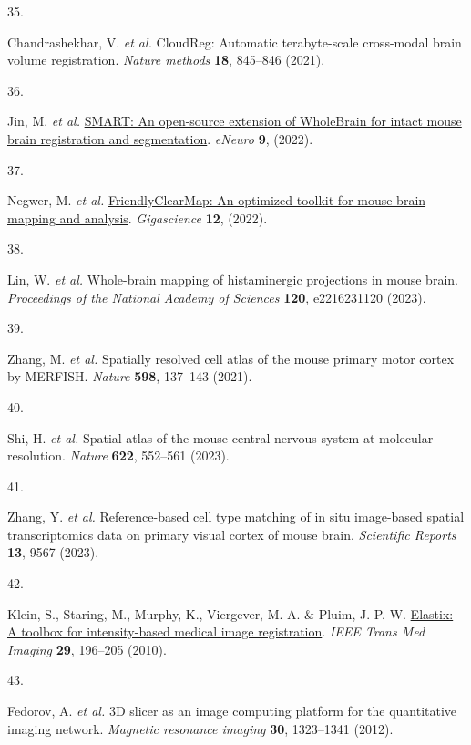 \documentclass[
  12pt,
]{article}
\newlength{\cslhangindent}
\newlength{\csllabelwidth}
\newenvironment{CSLReferences}[2] %
 {\begin{list}{}{%
  \setlength{\itemindent}{0pt}
  \setlength{\leftmargin}{0pt}
  \setlength{\parsep}{0pt}
  \ifodd #1
   \setlength{\leftmargin}{\cslhangindent}
   \setlength{\itemindent}{-1\cslhangindent}
  \fi
  \setlength{\itemsep}{#2\baselineskip}}}
 {\end{list}}
\newcommand{\CSLLeftMargin}[1]{\parbox[t]{\csllabelwidth}{\strut#1\strut}}
\newcommand{\CSLRightInline}[1]{\parbox[t]{\linewidth - \csllabelwidth}{\strut#1\strut}}
\begin{document}
\begin{CSLReferences}{0}{0}
\CSLLeftMargin{35. }%
\CSLRightInline{Chandrashekhar, V. \emph{et al.} CloudReg: Automatic
terabyte-scale cross-modal brain volume registration. \emph{Nature
methods} \textbf{18}, 845--846 (2021).}

\CSLLeftMargin{36. }%
\CSLRightInline{Jin, M. \emph{et al.}
\href{https://doi.org/10.1523/ENEURO.0482-21.2022}{SMART: An open-source
extension of WholeBrain for intact mouse brain registration and
segmentation}. \emph{eNeuro} \textbf{9}, (2022).}

\CSLLeftMargin{37. }%
\CSLRightInline{Negwer, M. \emph{et al.}
\href{https://doi.org/10.1093/gigascience/giad035}{FriendlyClearMap: An
optimized toolkit for mouse brain mapping and analysis}.
\emph{Gigascience} \textbf{12}, (2022).}

\CSLLeftMargin{38. }%
\CSLRightInline{Lin, W. \emph{et al.} Whole-brain mapping of
histaminergic projections in mouse brain. \emph{Proceedings of the
National Academy of Sciences} \textbf{120}, e2216231120 (2023).}

\CSLLeftMargin{39. }%
\CSLRightInline{Zhang, M. \emph{et al.} Spatially resolved cell atlas of
the mouse primary motor cortex by MERFISH. \emph{Nature} \textbf{598},
137--143 (2021).}

\CSLLeftMargin{40. }%
\CSLRightInline{Shi, H. \emph{et al.} Spatial atlas of the mouse central
nervous system at molecular resolution. \emph{Nature} \textbf{622},
552--561 (2023).}

\CSLLeftMargin{41. }%
\CSLRightInline{Zhang, Y. \emph{et al.} Reference-based cell type
matching of in situ image-based spatial transcriptomics data on primary
visual cortex of mouse brain. \emph{Scientific Reports} \textbf{13},
9567 (2023).}

\CSLLeftMargin{42. }%
\CSLRightInline{Klein, S., Staring, M., Murphy, K., Viergever, M. A. \&
Pluim, J. P. W. \href{https://doi.org/10.1109/TMI.2009.2035616}{Elastix:
A toolbox for intensity-based medical image registration}. \emph{IEEE
Trans Med Imaging} \textbf{29}, 196--205 (2010).}

\CSLLeftMargin{43. }%
\CSLRightInline{Fedorov, A. \emph{et al.} 3D slicer as an image
computing platform for the quantitative imaging network. \emph{Magnetic
resonance imaging} \textbf{30}, 1323--1341 (2012).}


\end{CSLReferences}
\end{document}
